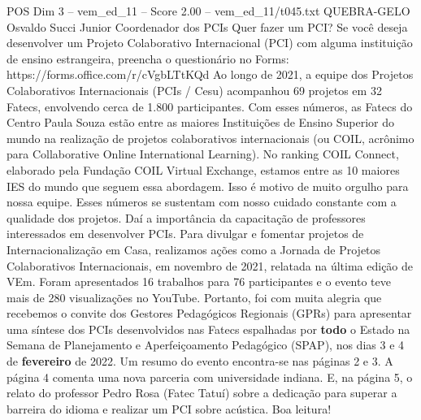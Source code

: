 \begin{textsample}{POS Dim 3 – vem\_ed\_11 – Score 2.00 – vem\_ed\_11/t045.txt}  \label{ex:f3_pos_016}
QUEBRA-GELO Osvaldo Succi Junior Coordenador dos PCIs Quer fazer um PCI?
Se você deseja desenvolver um Projeto Colaborativo Internacional (PCI) com alguma instituição de ensino estrangeira, preencha o questionário no Forms: https://forms.office.com/r/cVgbLTtKQd Ao longo de 2021, a equipe dos Projetos Colaborativos Internacionais (PCIs / Cesu) acompanhou 69 projetos em 32 Fatecs, envolvendo cerca de 1.800 participantes.
Com esses números, as Fatecs do Centro Paula Souza estão entre as maiores Instituições de Ensino Superior do mundo na realização de projetos colaborativos internacionais (ou COIL, acrônimo para Collaborative Online International Learning).
No ranking COIL Connect, elaborado pela Fundação COIL Virtual Exchange, estamos entre as 10 maiores IES do mundo que seguem essa abordagem.
Isso é motivo de muito orgulho para nossa equipe.
Esses números se sustentam com nosso cuidado constante com a qualidade dos projetos.
Daí a importância da capacitação de professores interessados em desenvolver PCIs.
Para divulgar e fomentar projetos de Internacionalização em Casa, realizamos ações como a Jornada de Projetos Colaborativos Internacionais, em novembro de 2021, relatada na última edição de VEm.
Foram apresentados 16 trabalhos para 76 participantes e o evento teve mais de 280 visualizações no YouTube.
Portanto, foi com muita alegria que recebemos o convite dos Gestores Pedagógicos Regionais (GPRs) para apresentar uma síntese dos PCIs desenvolvidos nas Fatecs espalhadas por \textbf{todo} o Estado na Semana de Planejamento e Aperfeiçoamento Pedagógico (SPAP), nos dias 3 e 4 de \textbf{fevereiro} de 2022.
Um resumo do evento encontra-se nas páginas 2 e 3.
A página 4 comenta uma nova parceria com universidade indiana.
E, na página 5, o relato do professor Pedro Rosa (Fatec Tatuí) sobre a dedicação para superar a barreira do idioma e realizar um PCI sobre acústica.
Boa leitura!

\end{textsample}
